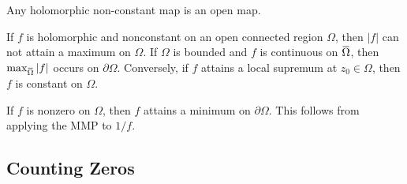\begin{corollary}

Any holomorphic non-constant map is an open map.

\end{corollary}


\begin{corollary}\label{MaximumModulus}

If \(f\) is holomorphic and nonconstant on an open connected region
\(\Omega\), then \({\left\lvert {f} \right\rvert}\) can not attain a
maximum on \(\Omega\). If \(\Omega\) is bounded and \(f\) is continuous
on
\(\mkern 1.5mu\overline{\mkern-1.5mu\Omega\mkern-1.5mu}\mkern 1.5mu\),
then
\(\max_{\mkern 1.5mu\overline{\mkern-1.5mu\Omega\mkern-1.5mu}\mkern 1.5mu} {\left\lvert {f} \right\rvert}\)
occurs on \({{\partial}}\Omega\). Conversely, if \(f\) attains a local
supremum at \(z_0 \in \Omega\), then \(f\) is constant on \(\Omega\).

\end{corollary}


\begin{corollary}[?]

If \(f\) is nonzero on \(\Omega\), then \(f\) attains a minimum on
\({{\partial}}\Omega\). This follows from applying the MMP to \(1/f\).

\end{corollary}

\hypertarget{counting-zeros}{%
\subsection{Counting Zeros}\label{counting-zeros}}

